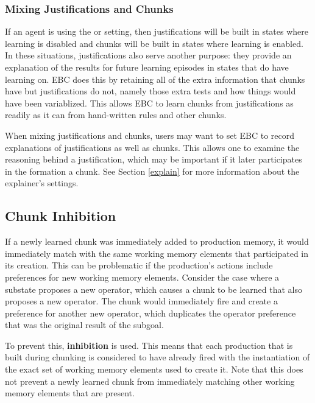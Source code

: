  \subsubsection{Mixing Justifications and Chunks}
 
If an agent is using the  or  setting, then justifications will be built in states where learning is disabled and chunks will be built in states where learning is enabled.  In these situations, justifications also serve another purpose:  they provide an explanation of the results for future learning episodes in states that do have learning on.  EBC does this by retaining all of the extra information that chunks have but justifications do not, namely those extra tests and how things would have been variablized.  This allows EBC to learn chunks from justifications as readily as it can from hand-written rules and other chunks.

When mixing justifications and chunks, users may want to set EBC to record explanations of justifications as well as chunks.  This allows one to examine the reasoning behind a justification, which may be important if it later participates in the formation a chunk. See Section \ref{explain} for more information about the explainer's settings.

\subsection{Chunk Inhibition}

If a newly learned chunk was immediately added to production memory, it would immediately match with the same working memory elements that participated in its creation.  This can be problematic if the production's actions include preferences for new working memory elements.  Consider the case where a substate proposes a new operator, which causes a chunk to be learned that also proposes a new operator. The chunk would immediately fire and create a preference for another new operator, which duplicates the operator preference that was the original result of the subgoal. 

To prevent this, \textbf{inhibition} is used. This means that each production that is built during chunking is considered to have already fired with the instantiation of the exact set of working memory elements used to create it. Note that this does not prevent a newly learned chunk from immediately matching other working memory elements that are present.

